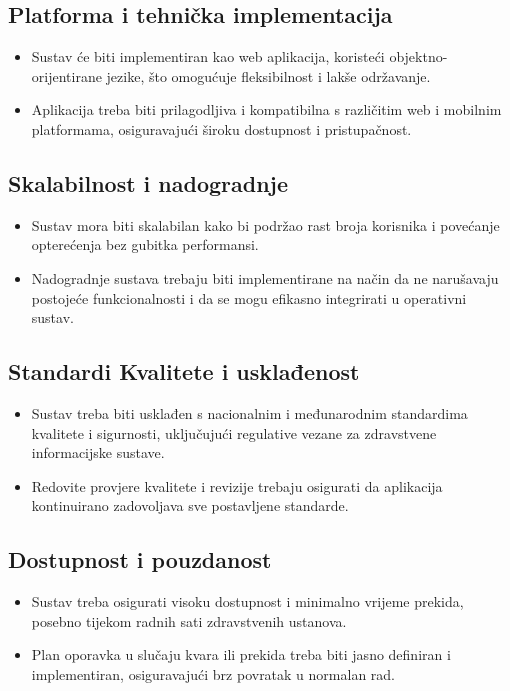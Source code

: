 \subsection*{Platforma i tehnička implementacija}
\begin{itemize}
    \item Sustav će biti implementiran kao web aplikacija, koristeći objektno-orijentirane jezike, što omogućuje fleksibilnost i lakše održavanje.
    \item Aplikacija treba biti prilagodljiva i kompatibilna s različitim web i mobilnim platformama, osiguravajući široku dostupnost i pristupačnost.
\end{itemize}

\subsection*{Skalabilnost i nadogradnje}
\begin{itemize}
    \item Sustav mora biti skalabilan kako bi podržao rast broja korisnika i povećanje opterećenja bez gubitka performansi.
    \item Nadogradnje sustava trebaju biti implementirane na način da ne narušavaju postojeće funkcionalnosti i da se mogu efikasno integrirati u operativni sustav.
\end{itemize}

\subsection*{Standardi Kvalitete i usklađenost}
\begin{itemize}
\item Sustav treba biti usklađen s nacionalnim i međunarodnim standardima kvalitete i sigurnosti, uključujući regulative vezane za zdravstvene informacijske sustave.
\item Redovite provjere kvalitete i revizije trebaju osigurati da aplikacija kontinuirano zadovoljava sve postavljene standarde.
\end{itemize}

\subsection*{Dostupnost i pouzdanost}
\begin{itemize}
\item Sustav treba osigurati visoku dostupnost i minimalno vrijeme prekida, posebno tijekom radnih sati zdravstvenih ustanova.
\item Plan oporavka u slučaju kvara ili prekida treba biti jasno definiran i implementiran, osiguravajući brz povratak u normalan rad.
\end{itemize}

